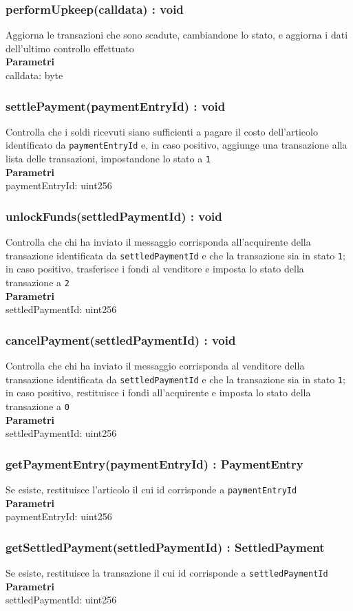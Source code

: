 \documentclass[a4paper, 12pt]{article}
\begin{document}
\subsubsection{performUpkeep(calldata) : void}
Aggiorna le transazioni che sono scadute, cambiandone lo stato, e aggiorna i dati dell'ultimo controllo effettuato\\
\textbf{Parametri}\\
calldata: byte
\subsubsection{settlePayment(paymentEntryId) : void}
Controlla che i soldi ricevuti siano sufficienti a pagare il costo dell'articolo identificato da \texttt{paymentEntryId} e, in caso positivo, aggiunge una transazione alla lista delle transazioni, impostandone lo stato a \texttt{1}\\
\textbf{Parametri}\\
paymentEntryId: uint256
\subsubsection{unlockFunds(settledPaymentId) : void}
Controlla che chi ha inviato il messaggio corrisponda all'acquirente della transazione identificata da \texttt{settledPaymentId} e che la transazione sia in stato \texttt{1}; in caso positivo, trasferisce i fondi al venditore e imposta lo stato della transazione a \texttt{2}\\
\textbf{Parametri}\\
settledPaymentId: uint256
\subsubsection{cancelPayment(settledPaymentId) : void}
Controlla che chi ha inviato il messaggio corrisponda al venditore della transazione identificata da \texttt{settledPaymentId} e che la transazione sia in stato \texttt{1}; in caso positivo, restituisce i fondi all'acquirente e imposta lo stato della transazione a \texttt{0}\\
\textbf{Parametri}\\
settledPaymentId: uint256
\subsubsection{getPaymentEntry(paymentEntryId) : PaymentEntry}
Se esiste, restituisce l'articolo il cui id corrisponde a \texttt{paymentEntryId}\\
\textbf{Parametri}\\
paymentEntryId: uint256
\subsubsection{getSettledPayment(settledPaymentId) : SettledPayment}
Se esiste, restituisce la transazione il cui id corrisponde a \texttt{settledPaymentId}\\
\textbf{Parametri}\\
settledPaymentId: uint256
\end{document}
